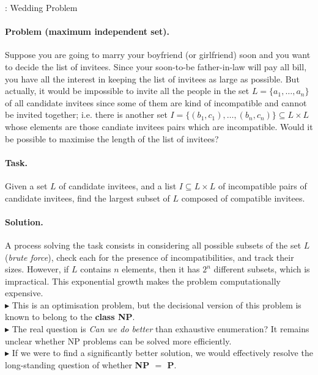 \documentclass{article}
\begin{document}
			\begin{example}{: Wedding Problem}
				{\small
				\paragraph{\small Problem (maximum independent set).}
				Suppose you are going to marry your boyfriend (or girlfriend) soon and you want to decide the list of invitees. Since your soon-to-be father-in-law will pay all bill, you have all the interest in keeping the list of invitees as large as possible. But actually, it would be impossible to invite all the people in the set $L = \{ a_1, \dots, a_n \}$ of all candidate invitees since some of them are kind of incompatible and cannot be invited together; i.e. there is another set $I = \{ (b_1, c_1), \dots, (b_n, c_n) \} \subseteq L \times L$ whose elements are those candiate invitees pairs which are incompatible. Would it be possible to maximise the length of the list of invitees?\\
				\paragraph{\small Task.}
				Given a set $L$ of candidate invitees, and a list $I \subseteq L \times L$ of incompatible pairs of candidate invitees, find the largest subset of $L$ composed of compatible invitees.\\
				\paragraph{\small Solution.}
					A process solving the task consists in considering all possible subsets of the set $L$ (\emph{brute force}), check each for the presence of incompatibilities, and track their sizes. However, if $L$ contains $n$ elements, then it has $2^n$ different subsets, which is impractical. This exponential growth makes the problem computationally expensive.\\
					
				$\blacktriangleright$ This is an optimisation problem, but the decisional version of this problem is known to belong to the \textbf{class NP}.\\
				$\blacktriangleright$ The real question is \emph{Can we do better} than exhaustive enumeration? It remains unclear whether NP problems can be solved more efficiently.\\
				$\blacktriangleright$ If we were to find a significantly better solution, we would effectively resolve the long-standing question of whether \textbf{NP $=$ P}.
				}
			\end{example}
\end{document}
